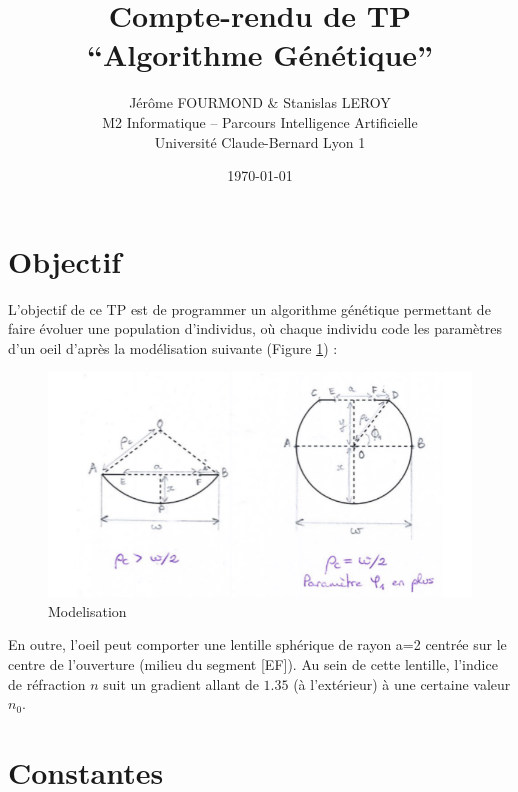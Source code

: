 \documentclass[a4paper,11pt]{article}
\begin{document}
\title{Compte-rendu de TP \\``Algorithme Génétique''}
\author{Jérôme FOURMOND \& Stanislas LEROY
\\ M2 Informatique – Parcours Intelligence Artificielle
\\Université Claude-Bernard Lyon 1}
\date{\today}
\maketitle

\tableofcontents
\newpage

\section{Objectif}

L'objectif de ce TP est de programmer un algorithme génétique permettant de faire évoluer une population d'individus, où chaque individu code les paramètres d'un oeil d'après la modélisation suivante (Figure \ref{fig:modelisation}) :

\begin{figure}[htbp]
\begin{center}
\includegraphics[width=15cm]{modelisation.png}
\caption{Modelisation}
\label{fig:modelisation}
\end{center}
\end{figure}

En outre, l'oeil peut comporter une lentille sphérique de rayon a=2 centrée sur le centre de l'ouverture (milieu du segment [EF]). Au sein de cette lentille, l'indice de réfraction $n$ suit un gradient allant de $1.35$ (à l'extérieur) à une certaine valeur $n_{0}$.

\section{Constantes}
\end{document}
